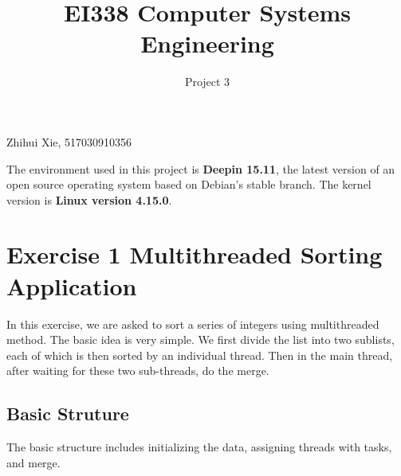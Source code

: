 \documentclass{article}
\title{EI338 Computer Systems Engineering}
\author{Project 3}
\begin{document}
\maketitle

\begin{center}
    Zhihui Xie, 517030910356
\end{center}

The environment used in this project is \textbf{Deepin 15.11}, the latest version of an open source operating system based on Debian's stable branch. The kernel version is \textbf{Linux version 4.15.0}.

\section*{Exercise 1 Multithreaded Sorting Application}
In this exercise, we are asked to sort a series of integers using multithreaded method. The basic idea is very simple. We first divide the list into two sublists, each of which is then sorted by an individual thread. Then in the main thread, after waiting for these two sub-threads, do the merge.

\subsection*{Basic Struture}
The basic structure includes initializing the data, assigning threads with tasks, and merge.
\end{document}
